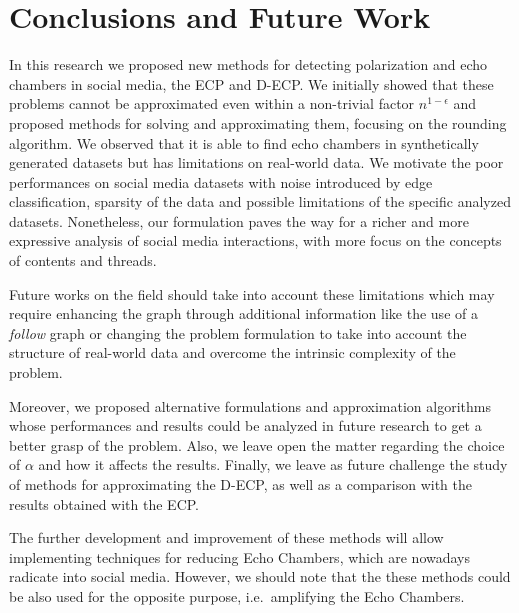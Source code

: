 \chapter{Conclusions and Future Work}
\label{ch:conclusionsAndFutureWork}

In this research we proposed new methods for detecting polarization and echo
chambers in social media, the \acrshort{ECP} and \acrshort{D-ECP}. We
initially showed that these problems cannot be approximated even within a
non-trivial factor $n^{1-\epsilon}$ and proposed methods for solving and
approximating them, focusing on the rounding algorithm. We observed that it is
able to find echo chambers in synthetically generated datasets but has limitations on
real-world data. We motivate the poor performances on social media datasets
with noise introduced by edge classification, sparsity of the data and
possible limitations of the specific analyzed datasets. Nonetheless, our formulation paves the way for a richer and more
expressive analysis of social media interactions, with more focus on the
concepts of contents and threads.

Future works on the field should take into account these limitations which
may require enhancing the graph through additional information like the use
of a \emph{follow} graph or
changing the problem formulation to take into account the structure
of real-world data and overcome the intrinsic complexity of the problem.

Moreover, we proposed alternative formulations and approximation algorithms
whose performances and results could be analyzed in future research to get a
better grasp of the problem. Also, we leave open the matter regarding the
choice of $\alpha$ and how it affects the results. Finally, we leave as future
challenge the study of methods for approximating the \acrshort{D-ECP}, as well
as a comparison with the results obtained with the \acrshort{ECP}.

\bigskip

The further development and improvement of these methods will allow
implementing techniques for reducing Echo Chambers, which are nowadays
radicate into social media. However, we should note that the these methods
could be also used for the opposite purpose, i.e.\ amplifying the Echo Chambers.
